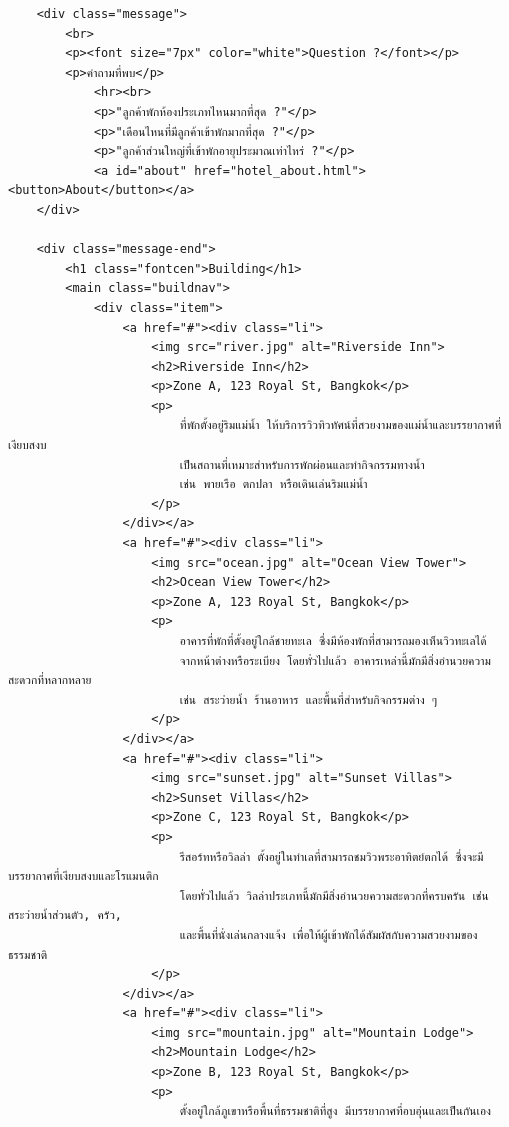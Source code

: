 \documentclass{report}
\begin{document}
\begin{verbatim}
    <div class="message">
        <br>
        <p><font size="7px" color="white">Question ?</font></p>
        <p>คำถามที่พบ</p>
            <hr><br>
            <p>"ลูกค้าพักห้องประเภทไหนมากที่สุด ?"</p>
            <p>"เดือนไหนที่มีลูกค้าเข้าพักมากที่สุด ?"</p>   
            <p>"ลูกค้าส่วนใหญ่ที่เข้าพักอายุประมาณเท่าไหร่ ?"</p>        
            <a id="about" href="hotel_about.html"><button>About</button></a>    
    </div>
    
    <div class="message-end">
        <h1 class="fontcen">Building</h1>
        <main class="buildnav">
            <div class="item">
                <a href="#"><div class="li">
                    <img src="river.jpg" alt="Riverside Inn">
                    <h2>Riverside Inn</h2>
                    <p>Zone A, 123 Royal St, Bangkok</p>
                    <p>
                        ที่พักตั้งอยู่ริมแม่น้ำ ให้บริการวิวทิวทัศน์ที่สวยงามของแม่น้ำและบรรยากาศที่เงียบสงบ 
                        เป็นสถานที่เหมาะสำหรับการพักผ่อนและทำกิจกรรมทางน้ำ 
                        เช่น พายเรือ ตกปลา หรือเดินเล่นริมแม่น้ำ
                    </p>
                </div></a>
                <a href="#"><div class="li">
                    <img src="ocean.jpg" alt="Ocean View Tower">
                    <h2>Ocean View Tower</h2>
                    <p>Zone A, 123 Royal St, Bangkok</p>
                    <p>
                        อาคารที่พักที่ตั้งอยู่ใกล้ชายทะเล ซึ่งมีห้องพักที่สามารถมองเห็นวิวทะเลได้
                        จากหน้าต่างหรือระเบียง โดยทั่วไปแล้ว อาคารเหล่านี้มักมีสิ่งอำนวยความสะดวกที่หลากหลาย 
                        เช่น สระว่ายน้ำ ร้านอาหาร และพื้นที่สำหรับกิจกรรมต่าง ๆ
                    </p>
                </div></a>
                <a href="#"><div class="li">
                    <img src="sunset.jpg" alt="Sunset Villas">
                    <h2>Sunset Villas</h2>
                    <p>Zone C, 123 Royal St, Bangkok</p>
                    <p>
                        รีสอร์ทหรือวิลล่า ตั้งอยู่ในทำเลที่สามารถชมวิวพระอาทิตย์ตกได้ ซึ่งจะมีบรรยากาศที่เงียบสงบและโรแมนติก 
                        โดยทั่วไปแล้ว วิลล่าประเภทนี้มักมีสิ่งอำนวยความสะดวกที่ครบครัน เช่น สระว่ายน้ำส่วนตัว, ครัว, 
                        และพื้นที่นั่งเล่นกลางแจ้ง เพื่อให้ผู้เข้าพักได้สัมผัสกับความสวยงามของธรรมชาติ     
                    </p>
                </div></a>
                <a href="#"><div class="li">
                    <img src="mountain.jpg" alt="Mountain Lodge">
                    <h2>Mountain Lodge</h2>
                    <p>Zone B, 123 Royal St, Bangkok</p>
                    <p>
                        ตั้งอยู่ใกล้ภูเขาหรือพื้นที่ธรรมชาติที่สูง มีบรรยากาศที่อบอุ่นและเป็นกันเอง 

\end{verbatim}
\end{document}

